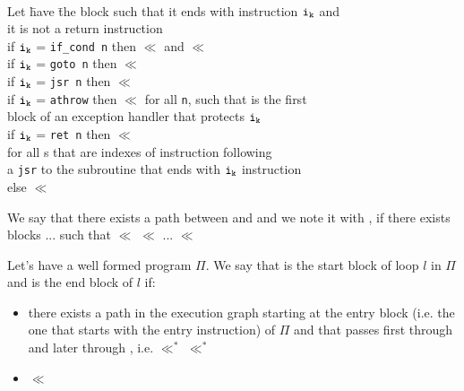 \begin{defn}\label{execRel}
\begin{tabbing}
\\Let \=  have \= the block  such that  it ends with instruction $\tt{i_{k}}$ and \\
it is not a return instruction\\
\>  if $\tt{i_{k}}$ = \texttt{if\_cond n} then    $\ll$  and   $\ll $   \\
\>  if $\tt{i_{k}}$ = \texttt{goto n} then  $\ll$  \\
\>  if $\tt{i_{k}}$ = \texttt{jsr n} then  $\ll$  \\
\>  if $\tt{i_{k}}$ = \texttt{athrow} then  $\ll$  for all \texttt{n}, such that  is the first\\
\> \> block of an exception handler that protects $\tt{i_{k}}$ \\
\>  if  $\tt{i_{k}}$ = \texttt{ret n} then   $\ll$ \\
\> \> for all s that are indexes of instruction following \\
\> \> a \texttt{jsr} to the subroutine that ends with $\tt{i_{k}}$ instruction\\
\>  else  $ \ll  $ 
\end{tabbing}
\end{defn}
We say that there exists a path between  and  and we note it with  , if there exists blocks ...  such that $\ll$ $\ll$ ... $\ll$ 
\begin{defn}
\label{defLoop}
Let's have a well formed program $\Pi$. We say that  is the start block of loop $l$ in $\Pi$ and  is the end block of $l$ if:
\begin{itemize}
\item there exists a path in the execution graph starting at the entry block  (i.e. the one that starts with the entry instruction) of $\Pi$ and that passes first through  and later through , i.e. $\ll^{*}$  $\ll^{*}$ 
\item {} $\ll$ 
\end{itemize}
\end{defn}

